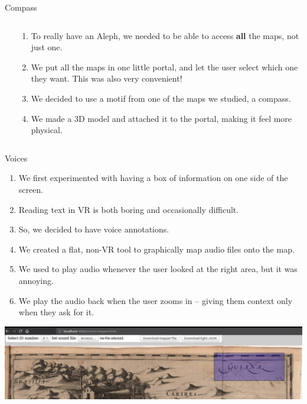 \documentclass{beamer}
\begin{document}
\begin{frame}{Compass}
	\begin{columns}[t]
		\begin{column}{.3\textwidth}
		\end{column}
		\begin{column}{.7\textwidth}
	\begin{enumerate}
		\item To really have an Aleph, we needed to be able to access
			\textbf{all} the maps, not just one.
		\item We put all the maps in one little portal, and let the user select which
			one they want. This was also very convenient!
		\item We decided to use a motif from one of the maps we studied, a compass.
		\item We made a 3D model and attached it to the portal, making it feel more physical.
	\end{enumerate}
		\end{column}
	\end{columns}
\end{frame}
\begin{frame}{Voices}
	\begin{enumerate}
		\item We first experimented with having a box of information on one side of the screen.
		\item Reading text in VR is both boring and occasionally difficult.
		\item So, we decided to have voice annotations. 
		\item We created a flat, non-VR tool to
			graphically map audio files onto the map.
		\item We used to play audio whenever the user looked at the right area, but it was
			annoying.
		\item We play the audio back when the user zooms in -- giving them context only
			when they ask for it.
	\end{enumerate}
	\includegraphics[width=\linewidth]{voices-mapper}
\end{frame}
\end{document}
